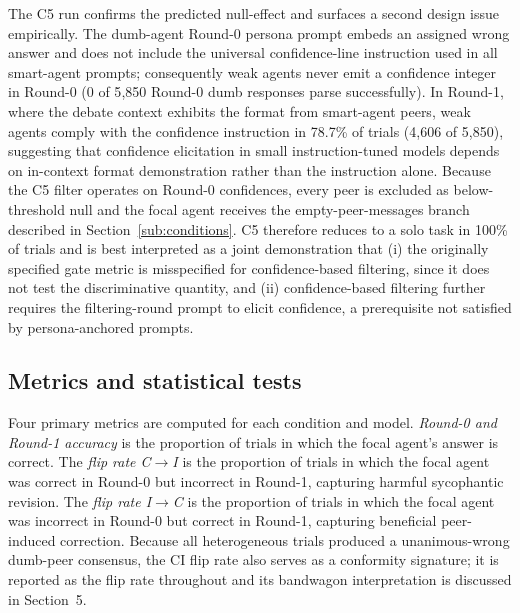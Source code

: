 \documentclass[review,3p,authoryear]{elsarticle}
\begin{document}
The C5 run confirms the predicted null-effect and surfaces a second
design issue empirically.
The dumb-agent Round-0 persona prompt embeds an assigned wrong answer
and does not include the universal confidence-line instruction used in
all smart-agent prompts; consequently weak agents never emit a
confidence integer in Round-0 (0 of 5{,}850 Round-0 dumb responses parse
successfully).
In Round-1, where the debate context exhibits the format from smart-agent
peers, weak agents comply with the confidence instruction in 78.7\% of
trials (4{,}606 of 5{,}850), suggesting that confidence elicitation in
small instruction-tuned models depends on in-context format
demonstration rather than the instruction alone.
Because the C5 filter operates on Round-0 confidences, every peer is
excluded as below-threshold null and the focal agent receives the
empty-peer-messages branch described in Section~\ref{sub:conditions}.
C5 therefore reduces to a solo task in 100\% of trials and is best
interpreted as a joint demonstration that (i) the originally specified
gate metric is misspecified for confidence-based filtering, since it
does not test the discriminative quantity, and (ii) confidence-based
filtering further requires the filtering-round prompt to elicit
confidence, a prerequisite not satisfied by persona-anchored prompts.

\subsection{Metrics and statistical tests}
\label{sub:stats}

Four primary metrics are computed for each condition and model.
\textit{Round-0 and Round-1 accuracy} is the proportion of trials in which
the focal agent's answer is correct.
The \textit{flip rate C$\rightarrow$I} is the proportion of trials in which
the focal agent was correct in Round-0 but incorrect in Round-1, capturing
harmful sycophantic revision.
The \textit{flip rate I$\rightarrow$C} is the proportion of trials in which
the focal agent was incorrect in Round-0 but correct in Round-1, capturing
beneficial peer-induced correction.
Because all heterogeneous trials produced a unanimous-wrong dumb-peer
consensus, the C\textrightarrow{}I flip rate also serves as a conformity
signature; it is reported as the flip rate throughout and its bandwagon
interpretation is discussed in Section~5.
\end{document}
